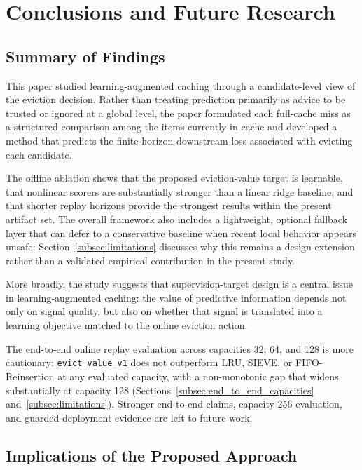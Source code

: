 \documentclass[preprint,12pt]{elsarticle}
\begin{document}
\section{Conclusions and Future Research}
\label{sec:conclusion}

\subsection{Summary of Findings}
\label{subsec:summary_findings}

This paper studied learning-augmented caching through a candidate-level view of the eviction decision. Rather than treating prediction primarily as advice to be trusted or ignored at a global level, the paper formulated each full-cache miss as a structured comparison among the items currently in cache and developed a method that predicts the finite-horizon downstream loss associated with evicting each candidate.

The offline ablation shows that the proposed eviction-value target is learnable, that nonlinear scorers are substantially stronger than a linear ridge baseline, and that shorter replay horizons provide the strongest results within the present artifact set. The overall framework also includes a lightweight, optional fallback layer that can defer to a conservative baseline when recent local behavior appears unsafe; Section~\ref{subsec:limitations} discusses why this remains a design extension rather than a validated empirical contribution in the present study.

More broadly, the study suggests that supervision-target design is a central issue in learning-augmented caching: the value of predictive information depends not only on signal quality, but also on whether that signal is translated into a learning objective matched to the online eviction action.

The end-to-end online replay evaluation across capacities 32, 64, and 128 is more cautionary: \texttt{evict\_value\_v1} does not outperform LRU, SIEVE, or FIFO-Reinsertion at any evaluated capacity, with a non-monotonic gap that widens substantially at capacity 128 (Sections~\ref{subsec:end_to_end_capacities} and~\ref{subsec:limitations}). Stronger end-to-end claims, capacity-256 evaluation, and guarded-deployment evidence are left to future work.

\subsection{Implications of the Proposed Approach}
\label{subsec:implications}
\end{document}
